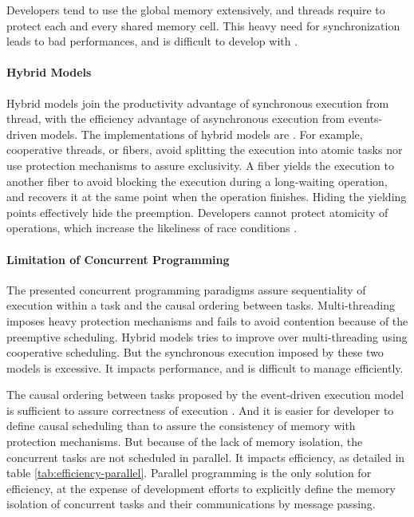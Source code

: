 Developers tend to use the global memory extensively, and threads require to protect each and every shared memory cell.
This heavy need for synchronization leads to bad performances, and is difficult to develop with \cite{Adya2002}.

\paragraph{Hybrid Models}

Hybrid models join the productivity advantage of synchronous execution from thread, with the efficiency advantage of asynchronous execution from events-driven models.
The implementations of hybrid models are .
For example, cooperative threads, or fibers, avoid splitting the execution into atomic tasks nor use protection mechanisms to assure exclusivity.
A fiber yields the execution to another fiber to avoid blocking the execution during a long-waiting operation, and recovers it at the same point when the operation finishes.
Hiding the yielding points effectively hide the preemption.
Developers cannot protect atomicity of operations, which increase the likeliness of race conditions .

\paragraph{Limitation of Concurrent Programming}

The presented concurrent programming paradigms assure sequentiality of execution within a task and the causal ordering between tasks.
Multi-threading imposes heavy protection mechanisms and fails to avoid contention because of the preemptive scheduling.
Hybrid models tries to improve over multi-threading using cooperative scheduling.
But the synchronous execution imposed by these two models is excessive.
It impacts performance, and is difficult to manage efficiently.

The causal ordering between tasks proposed by the event-driven execution model is sufficient to assure correctness of execution \cite{Lamport1978,Reed2012}.
And it is easier for developer to define causal scheduling than to assure the consistency of memory with protection mechanisms.
But because of the lack of memory isolation, the concurrent tasks are not scheduled in parallel.
It impacts efficiency, as detailed in table \ref{tab:efficiency-parallel}.
Parallel programming is the only solution for efficiency, at the expense of development efforts to explicitly define the memory isolation of concurrent tasks and their communications by message passing.

